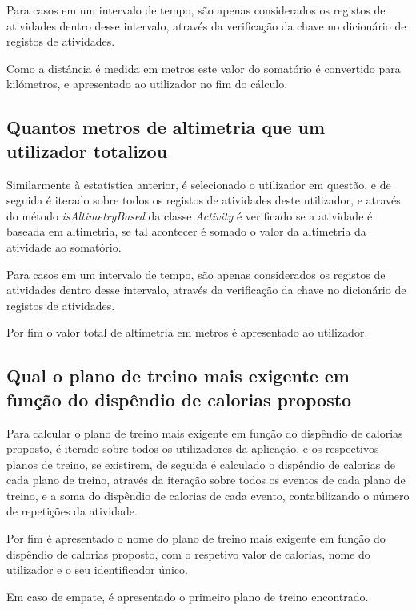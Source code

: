 \documentclass[a4paper,12pt]{scrreprt}
\begin{document}
        Para casos em um intervalo de tempo, são apenas considerados os registos de atividades dentro desse intervalo,
        através da verificação da chave no dicionário de registos de atividades.

        Como a distância é medida em metros este valor do somatório é convertido para kilómetros,
        e apresentado ao utilizador no fim do cálculo.

    \subsection{Quantos metros de altimetria que um utilizador totalizou}
        Similarmente à estatística anterior, é selecionado o utilizador em questão,
        e de seguida é iterado sobre todos os registos de atividades deste utilizador,
        e através do método \textit{isAltimetryBased} da classe \textit{Activity} é
        verificado se a atividade é baseada em altimetria, se tal acontecer é somado o valor da altimetria da atividade ao somatório.

        Para casos em um intervalo de tempo, são apenas considerados os registos de atividades dentro desse intervalo,
        através da verificação da chave no dicionário de registos de atividades.

        Por fim o valor total de altimetria em metros é apresentado ao utilizador.

    \subsection{Qual o plano de treino mais exigente em função do dispêndio de calorias proposto}
        Para calcular o plano de treino mais exigente em função do dispêndio de calorias proposto,
        é iterado sobre todos os utilizadores da aplicação,
        e os respectivos planos de treino, se existirem,
        de seguida é calculado o dispêndio de calorias de cada plano de treino,
        através da iteração sobre todos os eventos de cada plano de treino,
        e a soma do dispêndio de calorias de cada evento,
        contabilizando o número de repetições da atividade.

        Por fim é apresentado o nome do plano de treino mais exigente em função do dispêndio de calorias proposto,
        com o respetivo valor de calorias, nome do utilizador e o seu identificador único.

        Em caso de empate, é apresentado o primeiro plano de treino encontrado.
\end{document}
